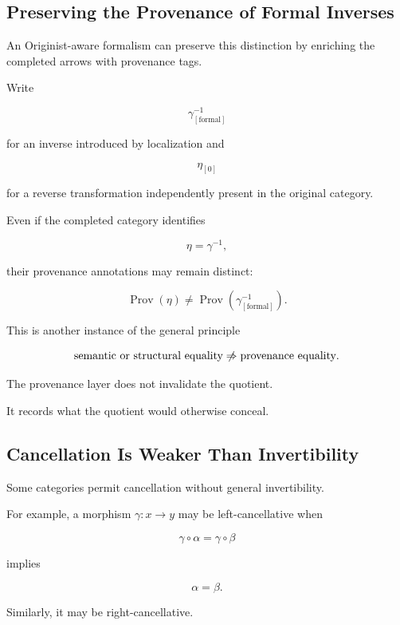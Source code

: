 \documentclass[
  11pt,
  a4paper,
  DIV=12,
  BCOR=0mm,
  parskip=half-
]{scrartcl}
\newcommand{\Prov}{\operatorname{Prov}}
\theoremstyle{definition}
\theoremstyle{plain}
\theoremstyle{remark}
\begin{document}
\subsection{Preserving the Provenance of Formal Inverses}
\label{app:tagged-completion}

An Originist-aware formalism can preserve this distinction by enriching the
completed arrows with provenance tags.

Write

\[
  \gamma^{-1}_{[\mathrm{formal}]}
\]

for an inverse introduced by localization and

\[
  \eta_{[0]}
\]

for a reverse transformation independently present in the original category.

Even if the completed category identifies

\[
  \eta
  =
  \gamma^{-1},
\]

their provenance annotations may remain distinct:

\[
  \Prov(\eta)
  \neq
  \Prov(\gamma^{-1}_{[\mathrm{formal}]}).
\]

This is another instance of the general principle

\[
  \text{semantic or structural equality}
  \centernot\Rightarrow
  \text{provenance equality}.
\]

The provenance layer does not invalidate the quotient.

It records what the quotient would otherwise conceal.


\subsection{Cancellation Is Weaker Than Invertibility}
\label{app:cancellation}

Some categories permit cancellation without general invertibility.

For example, a morphism \(\gamma:x\to y\) may be left-cancellative when

\[
  \gamma\circ\alpha
  =
  \gamma\circ\beta
\]

implies

\[
  \alpha=\beta.
\]

Similarly, it may be right-cancellative.
\end{document}
